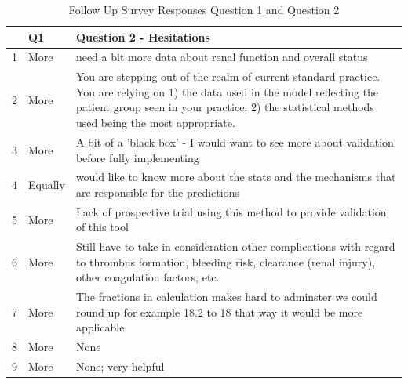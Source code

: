 \documentclass[12pt,a4paper,]{report}
\begin{document}
\begin{table}[H]
\centering
\caption{Follow Up Survey Responses Question 1 and Question 2}
\label{my-label}
\begin{tabularx}{\textwidth}{|l|l|X|}
\hline
 & Q1 & Question 2 - Hesitations \\ \hline
1 & More & need a bit more data about renal function and overall status \\ \hline
2 & More & You are stepping out of the realm of current standard practice. You are relying on 1) the data used in the model reflecting the patient group seen in your practice, 2) the statistical methods used being the most appropriate. \\ \hline
3 & More & A bit of a 'black box' - I would want to see more about validation before fully implementing \\ \hline
4 & Equally & would like to know more about the stats and the mechanisms that are responsible for the predictions \\ \hline
5 & More & Lack of prospective trial using this method to provide validation of this tool \\ \hline
6 & More & Still have to take in consideration other complications with regard to thrombus formation, bleeding risk, clearance (renal injury), other coagulation factors, etc. \\ \hline
7 & More & The fractions in calculation makes hard to adminster we could round up for example 18.2 to 18 that way it would be more applicable \\ \hline
8 & More & None \\ \hline
9 & More & None; very helpful \\ \hline
\end{tabularx}
\end{table}
\end{document}
